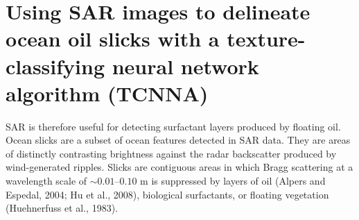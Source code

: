 \documentclass[paper=a4, fontsize=11pt]{scrartcl}
\begin{document}
\newpage

\section*{\textcolor{VioletRed4}{Using SAR images to delineate ocean oil slicks with a texture-classifying neural network algorithm (TCNNA)}}

SAR is therefore useful for detecting surfactant layers produced by floating oil.
Ocean slicks are a subset of ocean features detected in SAR data. 
They are areas of distinctly contrasting brightness against the radar backscatter produced by wind-generated ripples.
Slicks are contiguous areas in which Bragg scattering at a wavelength scale of $\sim 0.01–0.10$ m is suppressed by layers of oil (Alpers and Espedal, 2004; Hu et al., 2008), biological surfactants, or floating vegetation (Huehnerfuss et al., 1983).
\end{document}
